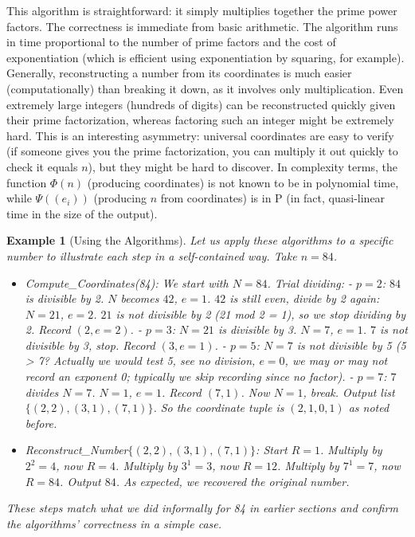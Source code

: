 \documentclass[11pt]{article}
\newtheorem{example}{Example}
\begin{document}
This algorithm is straightforward: it simply multiplies together the prime power factors. The correctness is immediate from basic arithmetic. The algorithm runs in time proportional to the number of prime factors and the cost of exponentiation (which is efficient using exponentiation by squaring, for example). Generally, reconstructing a number from its coordinates is much easier (computationally) than breaking it down, as it involves only multiplication. Even extremely large integers (hundreds of digits) can be reconstructed quickly given their prime factorization, whereas factoring such an integer might be extremely hard. This is an interesting asymmetry: universal coordinates are easy to verify (if someone gives you the prime factorization, you can multiply it out quickly to check it equals $n$), but they might be hard to discover. In complexity terms, the function $\Phi(n)$ (producing coordinates) is not known to be in polynomial time, while $\Psi((e_i))$ (producing $n$ from coordinates) is in P (in fact, quasi-linear time in the size of the output).

\begin{example}[Using the Algorithms]
Let us apply these algorithms to a specific number to illustrate each step in a self-contained way. Take $n = 84$.
\begin{itemize}
\item \textit{Compute\_Coordinates(84):} We start with $N=84$. Trial dividing:
  - $p=2$: $84$ is divisible by 2. $N$ becomes $42$, $e=1$. $42$ is still even, divide by 2 again: $N=21$, $e=2$. $21$ is not divisible by 2 (21 mod 2 = 1), so we stop dividing by 2. Record $(2, e=2)$.
  - $p=3$: $N=21$ is divisible by 3. $N=7$, $e=1$. $7$ is not divisible by 3, stop. Record $(3, e=1)$.
  - $p=5$: $N=7$ is not divisible by 5 (5 > 7? Actually we would test 5, see no division, $e=0$, we may or may not record an exponent 0; typically we skip recording since no factor).
  - $p=7$: $7$ divides $N=7$. $N=1$, $e=1$. Record $(7,1)$. Now $N=1$, break.
  Output list $\{(2,2), (3,1), (7,1)\}$. So the coordinate tuple is $(2,1,0,1)$ as noted before.
\item \textit{Reconstruct\_Number$\{(2,2),(3,1),(7,1)\}$:} Start $R=1$. Multiply by $2^2=4$, now $R=4$. Multiply by $3^1=3$, now $R=12$. Multiply by $7^1=7$, now $R=84$. Output $84$. As expected, we recovered the original number.
\end{itemize}
These steps match what we did informally for 84 in earlier sections and confirm the algorithms' correctness in a simple case.
\end{example}
\end{document}
